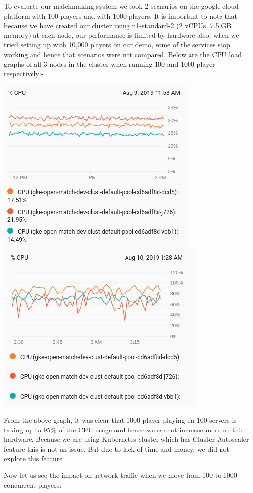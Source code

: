 \documentclass[12pt, letter]{article}
\begin{document}
To evaluate our matchmaking system we took 2 scenarios on the google cloud platform with 100 players and with 1000 players. It is important to note that because we have created our cluster using n1-standard-2 (2 vCPUs, 7.5 GB memory) at each node, our performance is limited by hardware also. when we tried setting up with 10,000 players on our demo, some of the services stop working and hence that scenarios were not compared. Below are the CPU load graphs of all 3 nodes in the cluster when running 100 and 1000 player respectively:-

\centerline{
   \includegraphics[width=.4\textwidth]{images/cpu100.png}
    \includegraphics[width=.4\textwidth]{images/cpu1000.png}
}

From the above graph, it was clear that 1000 player playing on 100 servers is taking up to 95\% of the CPU usage and hence we cannot increase more on this hardware. Because we are using Kubernetes cluster which has Cluster Autoscaler feature this is not an issue. But due to lack of time and money, we did not explore this feature.

Now let us see the impact on network traffic when we move from 100 to 1000 concurrent players:-
\end{document}
